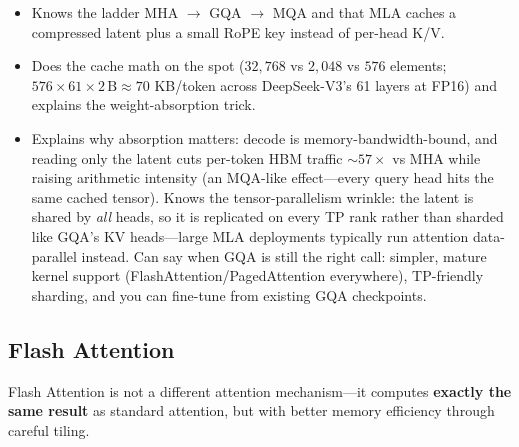 \begin{interviewq}

\goodgreat
\begin{itemize}
    \item {} Knows the ladder MHA $\to$ GQA $\to$ MQA and that MLA caches a compressed latent plus a small RoPE key instead of per-head K/V.
    \item {} Does the cache math on the spot ($32{,}768$ vs $2{,}048$ vs $576$ elements; $576 \times 61 \times 2\,\text{B} \approx 70$ KB/token across DeepSeek-V3's 61 layers at FP16) and explains the weight-absorption trick.
    \item {} Explains why absorption matters: decode is memory-bandwidth-bound, and reading only the latent cuts per-token HBM traffic $\sim 57\times$ vs MHA while raising arithmetic intensity (an MQA-like effect---every query head hits the same cached tensor). Knows the tensor-parallelism wrinkle: the latent is shared by \textit{all} heads, so it is replicated on every TP rank rather than sharded like GQA's KV heads---large MLA deployments typically run attention data-parallel instead. Can say when GQA is still the right call: simpler, mature kernel support (FlashAttention/PagedAttention everywhere), TP-friendly sharding, and you can fine-tune from existing GQA checkpoints.
\end{itemize}

\end{interviewq}

\subsection{Flash Attention}

\begin{keyinsight}
Flash Attention is not a different attention mechanism---it computes \textbf{exactly the same result} as standard attention, but with better memory efficiency through careful tiling.
\end{keyinsight}

